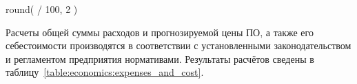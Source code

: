 
 { round( \totalExpense * \supportAndAdaptationRate / 100, 2 )}








Расчеты общей суммы расходов и прогнозируемой цены ПО, а также его себестоимости производятся в соответствии с установленными законодательством и регламентом предприятия нормативами. Результаты расчётов сведены в таблицу~\ref{table:economics:expenses_and_cost}.


